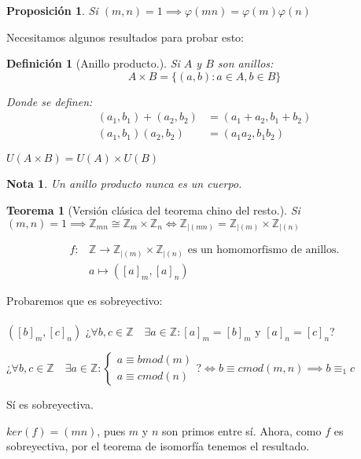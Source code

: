 \documentclass[11pt, a4paper, titlepage]{article}
\makeatletter
\renewenvironment{proof}[1][\proofname] {\vspace{-15pt}\par\pushQED{\qed}\normalfont\topsep6\p@\@plus6\p@\relax\trivlist\item[\hskip\labelsep\it#1\@addpunct{.}]\ignorespaces}{\popQED\endtrivlist\@endpefalse}
\theoremstyle{theorem-style}
\newtheorem*{nth}{Teorema}
\newtheorem*{nprop}{Proposición}
\theoremstyle{definition-style}
\newtheorem*{ndef}{Definición}
\theoremstyle{remark-style}
\newtheorem*{nota}{Nota}
\theoremstyle{example-style}
\makeatother
\begin{document}
\begin{nprop}
  Si $(m,n) = 1 \implies \varphi(mn) = \varphi(m)\varphi(n)$
\end{nprop}

Necesitamos algunos resultados para probar esto:

\begin{ndef}[Anillo producto.]
Si $A$ y $B$ son anillos:
\[
  A\times B = \{(a,b) : a\in A, b\in B\}
\]

Donde se definen:
\begin{align*}
  (a_1,b_1)+(a_2,b_2) &= (a_1+a_2, b_1+b_2)\\
  (a_1,b_1)(a_2,b_2) &= (a_1a_2, b_1b_2)
\end{align*}

$U(A\times B) = U(A)\times U(B)$

\end{ndef}

\begin{nota} Un anillo producto nunca es un cuerpo.
  
\end{nota}

\begin{nth}[Versión clásica del teorema chino del resto.]
Si $(m,n)=1 \implies \mathbb{Z}_{mn} \cong \mathbb{Z}_m \times \mathbb{Z}_n \iff \mathbb{Z}_{|(mn)} = \mathbb{Z}_{|(m)} \times \mathbb{Z}_{|(n)}$ 
\end{nth}

\begin{proof}
\begin{align*}
f:& \mathbb{Z} \longrightarrow \mathbb{Z}_{|(m)}\times \mathbb{Z}_{|(n)}\text{ es un homomorfismo de anillos.}\\
& a \longmapsto ([a]_m, [a]_n)
\end{align*}

Probaremos que es sobreyectivo:\\\\
$([b]_m,[c]_n)$ ¿$\forall b,c \in \mathbb{Z}\quad \exists a \in \mathbb{Z} : [a]_m = [b]_m \text{ y } [a]_n = [c]_n$?

¿$\forall b,c \in \mathbb{Z}\quad \exists a \in \mathbb{Z} : \begin{cases}
  a \equiv b mod(m)\\
  a \equiv c mod(n)
\end{cases}$?$ \iff b \equiv c mod(m,n) \implies b \equiv_1 c$

Sí es sobreyectiva.

$ker(f) = (mn)$, pues $m$ y $n$ son primos entre sí. Ahora, como $f$ es sobreyectiva, por el teorema de isomorfía tenemos el resultado.
\end{proof}
\end{document}
